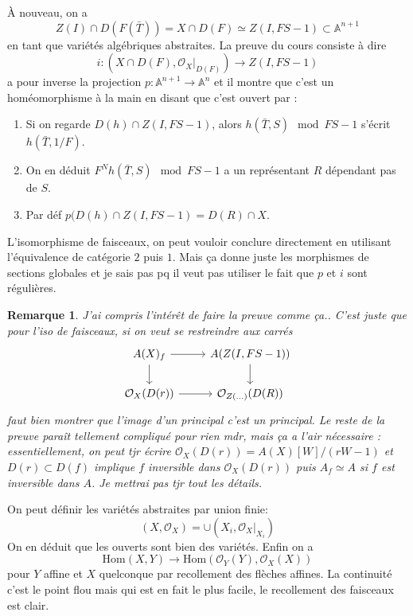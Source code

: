 \documentclass[a4paper,12pt]{book}
\newcommand{\A}{\mathbb{A}}
\newcommand{\Or}{\mathcal{O}}
\newcommand{\Hom}{\textrm{Hom}}
\theoremstyle{plain}
\newtheorem{rem}{Remarque}
\theoremstyle{definition}
\theoremstyle{remark}
\begin{document}
À nouveau, on a 
\[Z(I)\cap D(F(\bar T))=X\cap D(F)\simeq Z(I,FS-1)\subset \A^{n+1}\]
en tant que variétés algébriques abstraites. La preuve du cours 
consiste à dire 
\[ i\colon(X\cap D(F),\Or_X|_{D(F)})\to Z(I,FS-1)\]
a pour inverse la projection $p\colon \A^{n+1}\to \A^n$ et il montre
que c'est un homéomorphisme à la main en disant que c'est ouvert par :
\begin{enumerate}
    \item Si on regarde $D(h)\cap Z(I,FS-1)$, alors 
	$h(\bar T, S)\mod FS-1$ s'écrit $h(\bar T, 1/F)$.
    \item On en déduit $F^N h(\bar T, S) \mod FS-1$ a un représentant
	$R$ dépendant pas de $S$. 
    \item Par déf $p(D(h)\cap Z(I, FS-1)=D(R)\cap X$.
\end{enumerate}
L'isomorphisme de faisceaux, on peut vouloir conclure directement en 
utilisant l'équivalence de catégorie $2$ puis $1$. Mais ça donne juste 
les morphismes de sections globales et je sais pas pq il veut pas
utiliser le fait que $p$ et $i$ sont régulières.

\begin{rem}
    J'ai compris l'intérêt de faire la preuve comme ça.. C'est juste
    que pour l'iso de faisceaux, si on veut se restreindre aux carrés
\[\begin{tikzcd}
	{A(X)_f} & {A(Z(I,FS-1))} \\
	{\Or_X(D(r))} & {\Or_{Z(...)}(D(R))}
	\arrow[from=1-1, to=1-2]
	\arrow[from=1-1, to=2-1]
	\arrow[from=1-2, to=2-2]
	\arrow[from=2-1, to=2-2]
\end{tikzcd}\]
    faut bien montrer que l'image d'un principal c'est un principal.
    Le reste de la preuve paraît tellement compliqué pour rien mdr, 
    mais ça a l'air nécessaire : essentiellement, on peut tjr écrire
    $\Or_X(D(r))=A(X)[W]/(rW-1)$ et $D(r)\subset D(f)$ implique
    $f$ inversible dans $\Or_X(D(r))$ puis $A_f\simeq A$ si $f$
    est inversible dans $A$. Je mettrai pas tjr tout les détails.
\end{rem}
On peut définir les variétés abstraites par union finie:
\[(X,\Or_X)=\cup (X_i,\Or_X|_{X_i})\]
On en déduit que les ouverts sont bien des variétés. Enfin on a 
\[\Hom(X,Y)\to \Hom(\Or_Y(Y),\Or_X(X))\]
pour $Y$ affine et $X$ quelconque par recollement des flèches affines.
La continuité c'est le point flou mais qui est en fait le plus facile,
le recollement des faisceaux est clair.
\end{document}
